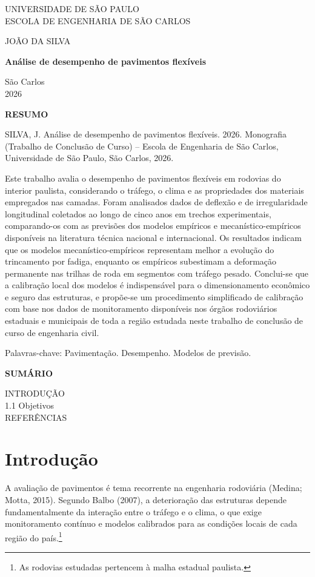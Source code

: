 \documentclass[12pt,a4paper]{report}
\begin{document}
\begin{titlepage}\centering
{\large UNIVERSIDADE DE SÃO PAULO\\ ESCOLA DE ENGENHARIA DE SÃO CARLOS\par}\vspace{4cm}
{\large JOÃO DA SILVA\par}\vspace{3cm}
{\large\bfseries Análise de desempenho de pavimentos flexíveis\par}\vfill
{\large São Carlos\\ 2026\par}
\end{titlepage}
\setcounter{page}{2}
\thispagestyle{empty}
\begin{center}\textbf{RESUMO}\end{center}
SILVA, J. Análise de desempenho de pavimentos flexíveis. 2026. Monografia (Trabalho de Conclusão de Curso) -- Escola de Engenharia de São Carlos, Universidade de São Paulo, São Carlos, 2026.

Este trabalho avalia o desempenho de pavimentos flexíveis em rodovias do interior paulista, considerando o tráfego, o clima e as propriedades dos materiais empregados nas camadas. Foram analisados dados de deflexão e de irregularidade longitudinal coletados ao longo de cinco anos em trechos experimentais, comparando-os com as previsões dos modelos empíricos e mecanístico-empíricos disponíveis na literatura técnica nacional e internacional. Os resultados indicam que os modelos mecanístico-empíricos representam melhor a evolução do trincamento por fadiga, enquanto os empíricos subestimam a deformação permanente nas trilhas de roda em segmentos com tráfego pesado. Conclui-se que a calibração local dos modelos é indispensável para o dimensionamento econômico e seguro das estruturas, e propõe-se um procedimento simplificado de calibração com base nos dados de monitoramento disponíveis nos órgãos rodoviários estaduais e municipais de toda a região estudada neste trabalho de conclusão de curso de engenharia civil.

\noindent Palavras-chave: Pavimentação. Desempenho. Modelos de previsão.
\clearpage
\thispagestyle{empty}
\begin{center}\textbf{SUMÁRIO}\end{center}
 INTRODUÇÃO\\
1.1 Objetivos\\
REFERÊNCIAS
\clearpage
\chapter{Introdução}
A avaliação de pavimentos é tema recorrente na engenharia rodoviária (Medina; Motta, 2015). Segundo Balbo (2007), a deterioração das estruturas depende fundamentalmente da interação entre o tráfego e o clima, o que exige monitoramento contínuo e modelos calibrados para as condições locais de cada região do país.\footnote{As rodovias estudadas pertencem à malha estadual paulista.}
\end{document}
